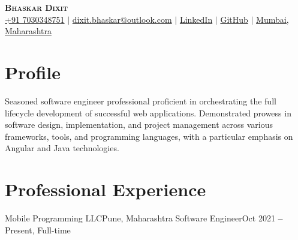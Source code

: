 \documentclass{resume}
\begin{document}

\begin{center}
    \textbf{\Huge \scshape Bhaskar Dixit} \\

    \small
    \faMobile \hspace{.5pt} \href{tel:917030348751}{+91 7030348751}
    $|$
    \faAt \hspace{.5pt} \href{mailto:dixit.bhaskar@outlook.com}{dixit.bhaskar@outlook.com}
    $|$
    \faLinkedinSquare \hspace{.5pt} \href{https://www.linkedin.com/in/bhaskar-dixit}{LinkedIn}
    $|$
    \faGithub \hspace{.5pt} \href{https://github.com/devBhaskar98}{GitHub}
    $|$
    \faMapMarker \hspace{.5pt} \href{https://maps.app.goo.gl/cxQaZHjSpMqCGx5s9}{Mumbai, Maharashtra}
\end{center}

\section{Profile}
{ Seasoned software engineer professional proficient in orchestrating the full lifecycle development of successful web applications. Demonstrated prowess in software design, implementation, and project management across various frameworks, tools, and programming languages, with a particular emphasis on Angular and Java technologies. }

\section{Professional Experience}
\vspace{3pt}

    \resumeSubHeadingListStart
    \resumeSubheading
          {Mobile Programming LLC}{Pune, Maharashtra}
          {Software Engineer}{Oct 2021 \textbf{--} Present, Full-time}
    
\end{document}
